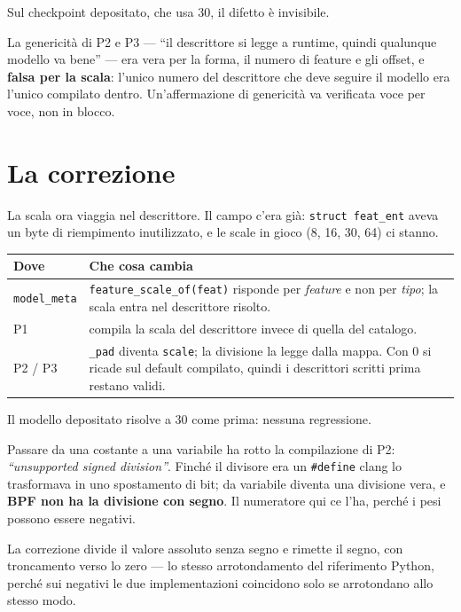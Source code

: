 \documentclass[11pt,a4paper,oneside]{report}
\begin{document}
Sul checkpoint depositato, che usa 30, il difetto è invisibile.

\begin{lezione}
La genericità di P2 e P3 --- ``il descrittore si legge a runtime, quindi
qualunque modello va bene'' --- era vera per la forma, il numero di feature e
gli offset, e \textbf{falsa per la scala}: l'unico numero del descrittore che
deve seguire il modello era l'unico compilato dentro. Un'affermazione di
genericità va verificata voce per voce, non in blocco.
\end{lezione}

\section{La correzione}

La scala ora viaggia nel descrittore. Il campo c'era già: \texttt{struct
feat\_ent} aveva un byte di riempimento inutilizzato, e le scale in gioco
(8, 16, 30, 64) ci stanno.

\begin{center}
\small
\begin{tabular}{@{}lp{8.8cm}@{}}
\toprule
\textbf{Dove} & \textbf{Che cosa cambia} \\
\midrule
\texttt{model\_meta} & \texttt{feature\_scale\_of(feat)} risponde per
  \emph{feature} e non per \emph{tipo}; la scala entra nel descrittore
  risolto. \\
P1 & compila la scala del descrittore invece di quella del catalogo. \\
P2 / P3 & \texttt{\_pad} diventa \texttt{scale}; la divisione la legge dalla
  mappa. Con 0 si ricade sul default compilato, quindi i descrittori scritti
  prima restano validi. \\
\bottomrule
\end{tabular}
\end{center}

Il modello depositato risolve a 30 come prima: nessuna regressione.

\begin{prima}
Passare da una costante a una variabile ha rotto la compilazione di P2:
\emph{``unsupported signed division''}. Finché il divisore era un \texttt{\#define}
clang lo trasformava in uno spostamento di bit; da variabile diventa una
divisione vera, e \textbf{BPF non ha la divisione con segno}. Il numeratore qui
ce l'ha, perché i pesi possono essere negativi.

La correzione divide il valore assoluto senza segno e rimette il segno, con
troncamento verso lo zero --- lo stesso arrotondamento del riferimento Python,
perché sui negativi le due implementazioni coincidono solo se arrotondano allo
stesso modo.
\end{prima}
\end{document}
